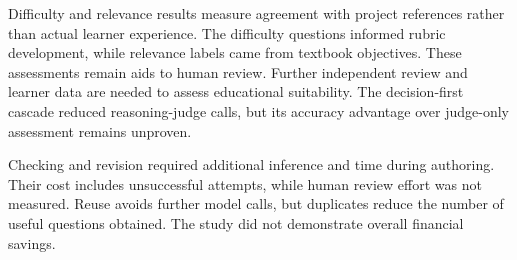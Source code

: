 Difficulty and relevance results measure agreement with project references rather than actual learner experience. The difficulty questions informed rubric development, while relevance labels came from textbook objectives. These assessments remain aids to human review. Further independent review and learner data are needed to assess educational suitability. The decision-first cascade reduced reasoning-judge calls, but its accuracy advantage over judge-only assessment remains unproven.

Checking and revision required additional inference and time during authoring. Their cost includes unsuccessful attempts, while human review effort was not measured. Reuse avoids further model calls, but duplicates reduce the number of useful questions obtained. The study did not demonstrate overall financial savings.
